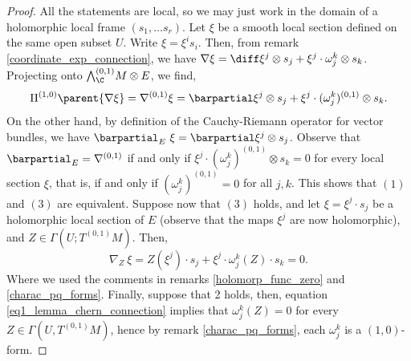 \begin{proof}
    All the statements are local, so we may just work in the domain of a holomorphic local frame \((s_1, \ldots s_r)\). Let \(\xi\) be a smooth local section defined on the same open subset \(U\). Write \(\xi=\xi^i s_i\). Then, from remark \ref{coordinate_exp_connection}, we have \(\nabla \xi=\diff \xi ^j \otimes s_j+ \xi^j \cdot \omega^k_j \otimes s_k\). Projecting onto \({\bigwedge}^{(0,1)}_\C M\otimes E\), we find,
    \[
    \Pi^{(1,0)} \parent{\nabla\xi}=\nabla^{(0,1)}\xi = \barpartial \xi^j \otimes s_j + \xi^j \cdot (\omega_j^k)^{(0,1)} \otimes s_k. 
    \]
    On the other hand, by definition of the Cauchy-Riemann operator for vector bundles, we have \(\barpartial_E \ \xi=\barpartial \xi^j \otimes s_j\). Observe that \(\barpartial_E = \nabla^{(0,1)}\) if and only if \(\xi^j \cdot (\omega^k_j)^{(0,1)} \otimes s_k=0\) for every local section \(\xi\), that is, if and only if \((\omega^k_j)^{(0,1)}=0\) for all \(j,k\). This shows that \((1)\) and \((3)\) are equivalent. Suppose now that \((3)\) holds, and let \(\xi=\xi^j\cdot s_j\) be a holomorphic local section of \(E\) (observe that the maps \(\xi^j\) are now holomorphic), and \(Z \in \Gamma(U; T^{(0,1)}M)\). Then,
    \begin{equation} \label{eq1_lemma_chern_connection}
    \nabla_{Z}\  \xi=Z(\xi^j) \cdot s_j+\xi^j \cdot \omega^k_j(Z) \cdot s_k  =0.
    \end{equation}
    Where we used the comments in remarks \ref{holomorp_func_zero} and \ref{charac_pq_forms}. Finally, suppose that 2 holds, then, equation \eqref{eq1_lemma_chern_connection} implies that \(\omega^k_j(Z)=0\) for every \(Z \in \Gamma(U, T^{(0,1)}M)\), hence  by remark \ref{charac_pq_forms}, each \(\omega^k_j\) is a \((1,0)\)-form.
\end{proof}

